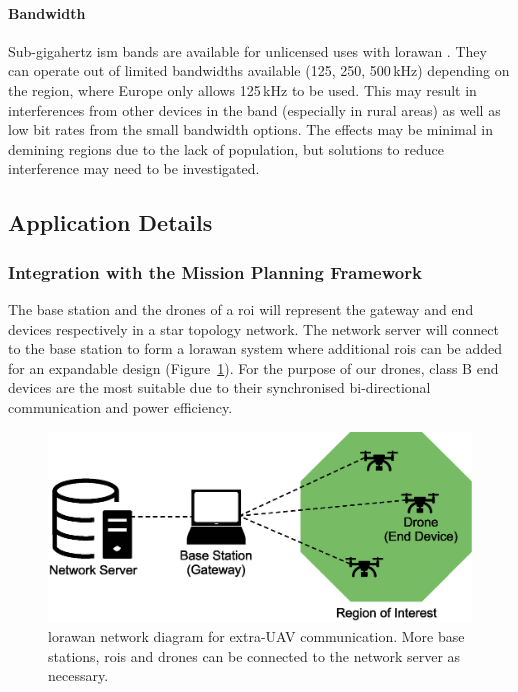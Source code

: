 \paragraph{Bandwidth} Sub-gigahertz \gls{ism} bands are available for unlicensed uses with \gls{lorawan} \cite{stokking2021lorawan}. They can operate out of limited bandwidths available (125, 250, 500\,kHz) depending on the region, where Europe only allows 125\,kHz to be used. This may result in interferences from other devices in the band (especially in rural areas) as well as low bit rates from the small bandwidth options. The effects may be minimal in demining regions due to the lack of population, but solutions to reduce interference may need to be investigated. 

\subsection{Application Details}
\label{sec:euc_application}

\subsubsection{Integration with the Mission Planning Framework}

The base station and the drones of a \gls{roi} will represent the gateway and end devices respectively in a star topology network. The network server will connect to the base station to form a \gls{lorawan} system where additional \gls{roi}s can be added for an expandable design (Figure~\ref{fig:euc_network_diagram}). For the purpose of our drones, class B end devices are the most suitable due to their synchronised bi-directional communication and power efficiency. 

\begin{figure}[h!]
    \centering
    \includegraphics[width=0.7\linewidth]{figs/Jihwan/Network Diagram of LoRa.eps}
    \caption[LoRaWAN Network Diagram for Extra-UAV Communication]
    {\gls{lorawan} network diagram for extra-\gls{UAV} communication. More base stations, \gls{roi}s and drones can be connected to the network server as necessary.}
    \label{fig:euc_network_diagram}
\end{figure}

